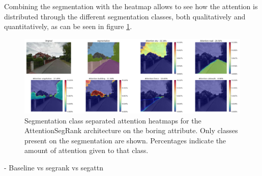 Combining the segmentation with the heatmap allows to see how the attention is distributed
through the different segmentation classes, both qualitatively and quantitatively, as can
be seen in figure \ref{fig:object_attention}.

\begin{figure}[ht]
	\begin{center}
	\includegraphics[width=1\textwidth]{./figures/object_attention.png}
	\caption[Attention by segmentation class heatmaps.]{
		Segmentation class separated attention heatmaps for the AttentionSegRank architecture on the boring attribute.
		Only classes present on the segmentation are shown. Percentages indicate the amount of attention given to that
		class.
        }
	\label{fig:object_attention}
	\end{center}
\end{figure}

- Baseline vs segrank vs segattn